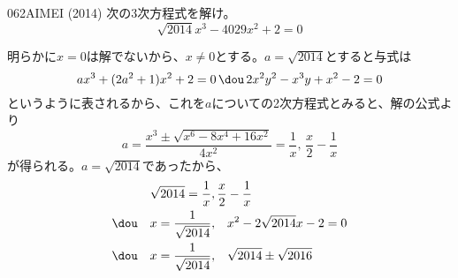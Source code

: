 \begin{thm}{062}{}{AIMEI (2014)}
 次の3次方程式を解け。\\
 \[ \sqrt{2014}x^3-4029x^2+2=0 \]
\end{thm}

明らかに$x=0$は解でないから、$x\neq 0$とする。$a=\sqrt{2014}$とすると与式は
\[ ax^3+(2a^2+1)x^2+2=0 \,\dou\, 2x^2y^2-x^3y+x^2-2=0 \]
というように表されるから、これを$a$についての2次方程式とみると、解の公式より
\[ a=\frac{x^3\pm\sqrt{x^6-8x^4+16x^2}}{4x^2}=\frac{1}{x},\, \frac{x}{2}-\frac{1}{x} \]
が得られる。$a=\sqrt{2014}$であったから、
\begin{align*}
 \sqrt{2014}=\frac{1}{x},&\, \frac{x}{2}-\frac{1}{x} \\
 \dou\quad x=\frac{1}{\sqrt{2014}},&\quad x^2-2\sqrt{2014}x-2=0 \\
 \dou\quad x=\frac{1}{\sqrt{2014}},&\quad \sqrt{2014}\pm\sqrt{2016}
\end{align*}